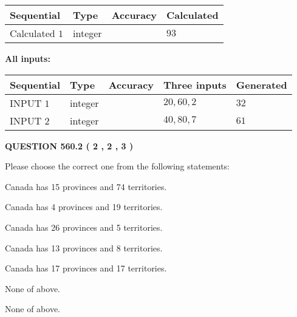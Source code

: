 \documentclass[12pt]{article}
\begin{document}
   
  
  
\noindent\begin{tabular}{|l|l|l|l|}
\hline
 Sequential & Type & Accuracy & Calculated \\ 
\hline
 
 
  Calculated $  1 $ & integer &  & 
  $ 93 $ 
 \\  \hline  
 \end{tabular}
   
   
   
   
\noindent\vspace{0.1in}\hspace{-0.08in} {\textbf{\Large{All inputs: }}}
   
   
  
  
\noindent\begin{tabular}{|l|l|l|l|l|}
\hline
 Sequential & Type & Accuracy & Three inputs & Generated \\ 
\hline
 
 
  INPUT $  1 $ & integer &  & $
 20
 , 
 60
 , 
 2
 $ & $ 32 $ 
 \\  \hline  
 
 
  INPUT $  2 $ & integer &  & $
 40
 , 
 80
 , 
 7
 $ & $ 61 $ 
 \\  \hline  
 \end{tabular}
   
   
  
\vspace{0.2in}
  
{\textbf{\Large{QUESTION
560.2 
 ( 2 , 2 , 3 )
}}}
  
  
Please choose the correct one from the following statements:
 
 
Canada has  15 provinces and  74 territories.
 
 
Canada has   4 provinces and  19 territories.
 
 
Canada has  26 provinces and  5 territories.
 
 
Canada has  13 provinces and  8 territories.
 
 
Canada has  17 provinces and  17 territories.
 
 
 None of above.
 
 
\noindent{}
 
 
 None of above.
 
\end{document}
